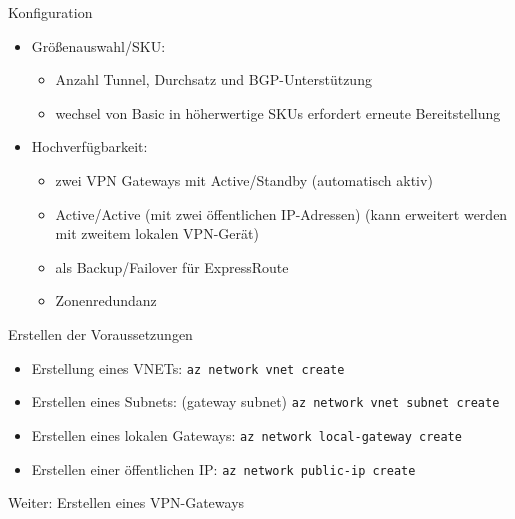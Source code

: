 \begin{flashcard}[Definition]{Konfiguration}
    \begin{itemize}
        \item Größenauswahl/SKU:
            \begin{itemize}
                \item Anzahl Tunnel, Durchsatz und BGP-Unterstützung
                \item wechsel von Basic in höherwertige SKUs erfordert erneute Bereitstellung
            \end{itemize}
        \item Hochverfügbarkeit:
            \begin{itemize}
                \item zwei VPN Gateways mit Active/Standby\newline
                    (automatisch aktiv)
                \item Active/Active (mit zwei öffentlichen IP-Adressen)\newline
                    (kann erweitert werden mit zweitem lokalen VPN-Gerät)
                \item als Backup/Failover für ExpressRoute
                \item Zonenredundanz
            \end{itemize}
    \end{itemize}
\end{flashcard}

\begin{flashcard}[Definition]{Erstellen der Voraussetzungen}
    \begin{itemize}
        \item Erstellung eines VNETs:\newline
            \texttt{az network vnet create }
        \item Erstellen eines Subnets: (gateway subnet)\newline
            \texttt{az network vnet subnet create}
        \item Erstellen eines lokalen Gateways:\newline
            \texttt{az network local-gateway create}
        \item Erstellen einer öffentlichen IP:\newline
            \texttt{az network public-ip create}
    \end{itemize}

    Weiter: Erstellen eines VPN-Gateways
\end{flashcard}

